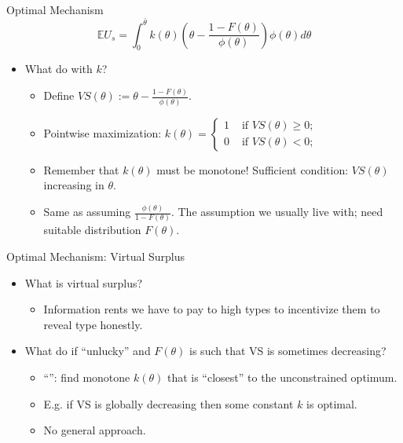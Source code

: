 \documentclass[english,10pt
,aspectratio=169
]{beamer}
\begin{document}
\begin{frame}{Optimal Mechanism}
\begin{equation*}
	\mathbb{E} U_s = \int_0^{\bar{\theta}} k(\theta) \left( \theta - \frac{1-F(\theta)}{\phi(\theta)} \right) \phi(\theta) d\theta
\end{equation*}
\begin{itemize}
	\item What do with $k$?
	\begin{itemize}[<+->]
		\item Define  $VS(\theta) := \theta - \frac{1-F(\theta)}{\phi(\theta)}$.
		\item Pointwise maximization: 
		$k(\theta) = \begin{cases}
			1 & \text{ if } VS(\theta) \geq 0;
			\\ 0 & \text{ if } VS(\theta) < 0;
		\end{cases}$
		\item Remember that $k(\theta)$ must be monotone! Sufficient condition: $VS(\theta)$ increasing in $\theta$.
		\item Same as assuming  $\frac{\phi(\theta)}{1-F(\theta)}$. The assumption we usually live with; need suitable distribution $F(\theta)$.
	\end{itemize}
\end{itemize}
\end{frame}


\begin{frame}{Optimal Mechanism: Virtual Surplus}
\begin{itemize}
	\item What is virtual surplus?
	\begin{itemize}
		\item Information rents we have to pay to high types to incentivize them to reveal type honestly.
	\end{itemize}
	\item What do if ``unlucky'' and $F(\theta)$ is such that VS is sometimes decreasing?
	\begin{itemize}
		\item ``'': find monotone $k(\theta)$ that is ``closest'' to the unconstrained optimum.
		\item E.g. if VS is globally decreasing then some constant $k$ is optimal.
		\item No general approach.
	\end{itemize}
\end{itemize}
\end{frame}
\end{document}
